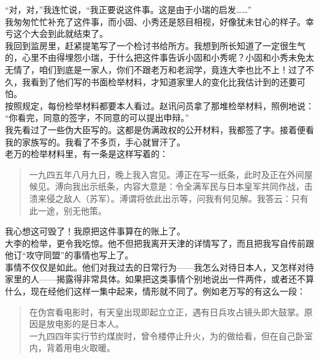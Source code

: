 “对，对，”我连忙说，“我正要说这件事。这是由于小瑞的启发……”\\

我匆匆忙忙补充了这件事，而小固、小秀还是怒目相视，好像犹未甘心的样子。幸亏这个大会到此就结束了。\\

我回到监房里，赶紧提笔写了一个检讨书给所方。我想到所长知道了一定很生气的，心里不由得埋怨小瑞，于什么把这件事告诉小固和小秀呢？小固和小秀未免太无情了，咱们到底是一家人，你们不跟老万和老润学，竟连大李也比不上！过了不久，我看到了他们写的书面检举材料，才知道家里人的变化比我估计到的还要可怕。\\

按照规定，每份检举材料都要本人看过。赵讯问员拿了那堆检举材料，照例地说：\\

“你看完，同意的签字，不同意的可以提出申辩。”\\

我先看过了一些伪大臣写的。这都是伪满政权的公开材料，我都签了字。接着便看我的家族写的。我看了不多页，手心就冒汗了。\\

老万的检举材料里，有一条是这样写着的：\\

\begin{quote}
	一九四五年八月九日，晚上我入宫见。溥正在写一纸条，此时及正在外间屋候见。溥向我出示纸条，内容大意是：令全满军民与日本皇军共同作战，击溃来侵之敌人（苏军）。溥谓将依此出示等，问我有何见解。我答云：只有此一途，别无他策。\\
\end{quote}

我心想这可毁了！我原把这件事算在的账上了。\\

大李的检举，更令我吃惊。他不但把我离开天津的详情写了，而且把我写自传前跟他订“攻守同盟”的事情也写上了。\\

事情不仅仅是如此。他们对我过去的日常行为——我怎么对待日本人，又怎样对待家里的人——揭露得非常具体。如果把这类事情个别地说出一件两件，或者还不算什么，现在经他们这样一集中起来，情形就不同了。例如老万写的有这么一段：\\

\begin{quote}
	在伪宫看电影时，有天皇出现即起立立正，遇有日兵攻占镜头即大鼓掌。原因是放电影的是日本人。\\

一九四四年实行节约煤炭时，曾令楼停止升火，为的做给看，但在自己卧室内，背着用电火取暖。\\
\end{quote}

